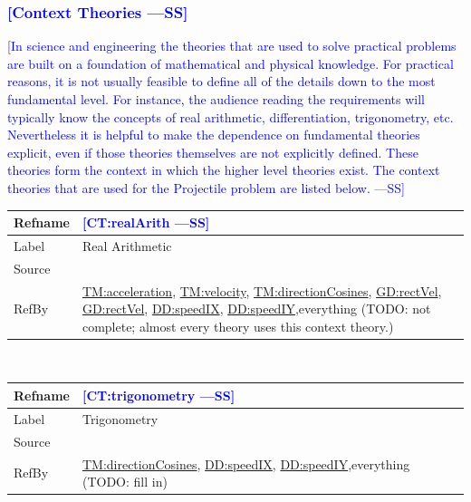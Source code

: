 \documentclass[12pt]{article}
\newcommand{\authornote}[3]{\textcolor{#1}{[#3 ---#2]}}
\newcommand{\authornote}[3]{}
\newcommand{\wss}[1]{\authornote{blue}{SS}{#1}}
\begin{document}
\subsubsection{\wss{Context Theories}}

\wss{In science and engineering the theories that are used to solve practical
problems are built on a foundation of mathematical and physical knowledge. For
practical reasons, it is not usually feasible to define all of the details down
to the most fundamental level. For instance, the audience reading the
requirements will typically know the concepts of real arithmetic,
differentiation, trigonometry, etc.  Nevertheless it is helpful to make the
dependence on fundamental theories explicit, even if those theories themselves
are not explicitly defined. These theories form the context in which the higher
level theories exist.  The context theories that are used for the Projectile
problem are listed below.}

\medskip
\noindent
\begin{minipage}{\textwidth}
\begin{tabular}{>{\raggedright}p{}>{\raggedright\arraybackslash}p{}}
\toprule \textbf{Refname} & \textbf{\wss{CT:realArith}}
\label{CT:realArith}
\\ \midrule
Label & Real Arithmetic
\\ \midrule
Source & \cite{}
\\ \midrule
RefBy & \hyperref[TM:acceleration]{TM:acceleration},
\hyperref[TM:velocity]{TM:velocity},
\hyperref[TM:directionCosines]{TM:directionCosines},
\hyperref[GD:rectVel]{GD:rectVel}, \hyperref[GD:rectVel]{GD:rectVel}, \hyperref[DD:speedIX]{DD:speedIX}, \hyperref[DD:speedIY]{DD:speedIY},everything (TODO: not complete; almost every theory uses this context theory.)
\\ \bottomrule
\end{tabular}
\end{minipage}
~\\

\medskip
\noindent
\begin{minipage}{\textwidth}
\begin{tabular}{>{\raggedright}p{}>{\raggedright\arraybackslash}p{}}
\toprule \textbf{Refname} & \textbf{\wss{CT:trigonometry}}
\label{CT:trigonometry}
\\ \midrule
Label & Trigonometry
\\ \midrule
Source & \cite{}
\\ \midrule
RefBy & \hyperref[TM:directionCosines]{TM:directionCosines}, \hyperref[DD:speedIX]{DD:speedIX}, \hyperref[DD:speedIY]{DD:speedIY},everything (TODO: fill in)
\\ \bottomrule
\end{tabular}
\end{minipage}
~\\
\end{document}
